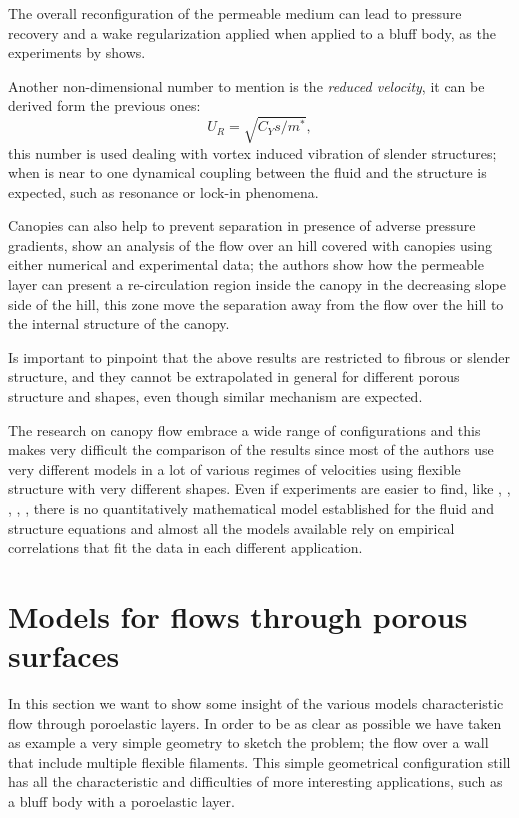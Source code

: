 The overall reconfiguration of the permeable medium can lead to pressure recovery and a wake regularization applied when applied to a bluff body, as the experiments by \citet{gosselin2011drag} shows.

Another non-dimensional number to mention is the \textit{reduced velocity}, it can be derived form the previous ones:
$$ U_R = \sqrt{C_Y s / m^*},$$
this number is used dealing with vortex induced vibration of slender structures; when is near to one dynamical coupling between the fluid and the structure is expected, such as resonance or lock-in phenomena.

Canopies can also help to prevent separation in presence of adverse pressure gradients, \citet{belcher2012wind} show an analysis of the flow over an hill covered with canopies using either numerical and experimental data; the authors show how the permeable layer can present a re-circulation region inside the canopy in the decreasing slope side of the hill, this zone move the separation away from the flow over the hill to the internal structure of the canopy.

Is important to pinpoint that the above results are restricted to fibrous or slender structure, and they cannot be extrapolated in general for different porous structure and shapes, even though similar mechanism are expected.

The research on canopy flow embrace a wide range of configurations and this makes very difficult the comparison of the results since most of the authors use very different models in a lot of various regimes of velocities using flexible structure with very different shapes.
Even if experiments are easier to find, like \citet{segalini2011experimental}, \citet{segalini2013scaling}, \citet{maza2013coupled}, \citet{barsu2016drag}, \citet{alvarado2017nature}, there is no quantitatively mathematical model established for the fluid and structure equations and almost all the models available rely on empirical correlations that fit the data in each different application.


\section{Models for flows through porous surfaces}

In this section we want to show some insight of the various models characteristic flow through poroelastic layers.
In order to be as clear as possible we have taken as example a very simple geometry to sketch the problem; the flow over a wall that include multiple flexible filaments. 
This simple geometrical configuration still has all the characteristic and difficulties of more interesting applications, such as a bluff body with a poroelastic layer.

